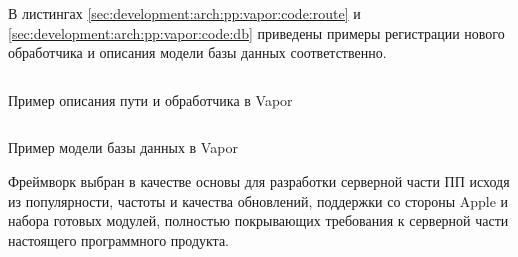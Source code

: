 В листингах \ref{sec:development:arch:pp:vapor:code:route} и \ref{sec:development:arch:pp:vapor:code:db} приведены примеры регистрации нового обработчика и описания модели базы данных соответственно.

\begin{code}
	\inputminted{swift}{inc/src/vapor_route.swift}
   \caption{Пример описания пути и обработчика в Vapor}
   \label{sec:development:arch:pp:vapor:code:route}
\end{code}

\begin{code}
	\inputminted{swift}{inc/src/vapor_db.swift}
   \caption{Пример модели базы данных в Vapor}
   \label{sec:development:arch:pp:vapor:code:db}
\end{code}

Фреймворк выбран в качестве основы для разработки серверной части ПП исходя из популярности, частоты и качества обновлений, поддержки со стороны Apple и набора готовых модулей, полностью покрывающих требования к серверной части настоящего программного продукта.